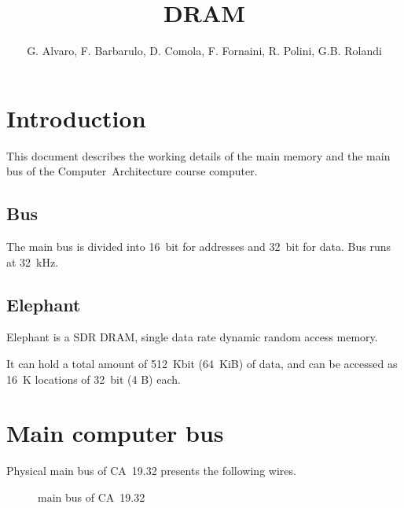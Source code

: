 \documentclass[a4paper,12pt]{article}
\title{\memoryname{} DRAM}
\author{G. Alvaro, F. Barbarulo, D. Comola, F. Fornaini, R. Polini, G.B. Rolandi}
\makeatletter
\newcommand*{\textoverline}[1]{$\overline{\hbox{#1}}\m@th$}
\newcommand{\computername}{CA~19.32}
\newcommand{\memoryname}{Elephant}
\makeatother
\begin{document}
\maketitle
\tableofcontents

\clearpage
\clearpage

\section{Introduction}

This document describes the working details of the main memory and the main bus of the Computer~Architecture course computer.

\subsection{Bus}
The main bus is divided into 16~bit for addresses and 32~bit for data.
Bus runs at 32~kHz.

\subsection{\memoryname{}}
\memoryname{} is a SDR DRAM, single data rate dynamic random access memory.

It can hold a total amount of 512~Kbit (64~KiB) of data, and can be accessed as 16~K locations of 32~bit (4 B) each.

\section{Main computer bus}
Physical main bus of \computername{} presents the following wires.

\begin{figure}[H]
\centering
{}
\caption{main bus of \computername{}}
\end{figure}
\end{document}
